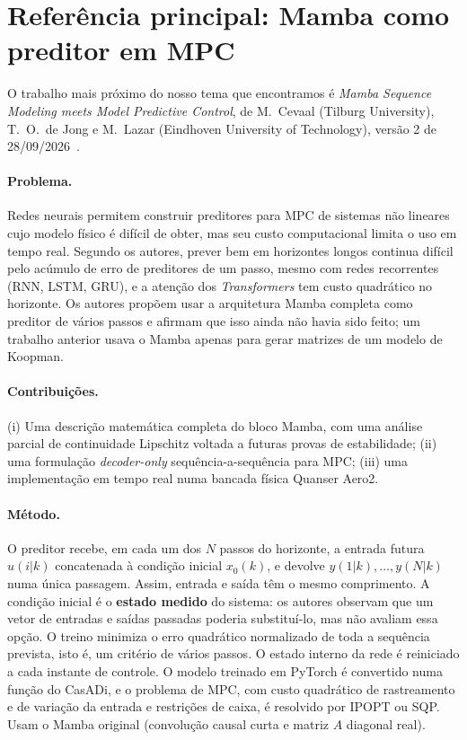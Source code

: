 \documentclass[11pt,a4paper]{article}
\begin{document}
\section{Referência principal: Mamba como preditor em MPC}\label{sec:artigo}

O trabalho mais próximo do nosso tema que encontramos é \emph{Mamba Sequence Modeling meets Model
Predictive Control}, de M.~Cevaal (Tilburg University), T.~O.~de Jong e M.~Lazar (Eindhoven
University of Technology), versão 2 de 28/09/2026~\cite{cevaal2026}.

\paragraph{Problema.} Redes neurais permitem construir preditores para MPC de sistemas não lineares
cujo modelo físico é difícil de obter, mas seu custo computacional limita o uso em tempo real.
Segundo os autores, prever bem em horizontes longos continua difícil pelo acúmulo de erro de
preditores de um passo, mesmo com redes recorrentes (RNN, LSTM, GRU), e a atenção dos
\emph{Transformers} tem custo quadrático no horizonte. Os autores propõem usar a arquitetura Mamba completa como
preditor de vários passos e afirmam que isso ainda não havia sido feito; um trabalho anterior usava
o Mamba apenas para gerar matrizes de um modelo de Koopman.

\paragraph{Contribuições.} (i) Uma descrição matemática completa do bloco Mamba, com uma análise
parcial de continuidade Lipschitz voltada a futuras provas de estabilidade; (ii) uma formulação
\emph{decoder-only} sequência-a-sequência para MPC; (iii) uma implementação em tempo real numa
bancada física Quanser Aero2.

\paragraph{Método.} O preditor recebe, em cada um dos $N$ passos do horizonte, a entrada futura
$u(i|k)$ concatenada à condição inicial $x_0(k)$, e devolve $y(1|k),\dots,y(N|k)$ numa única
passagem. Assim, entrada e saída têm o mesmo comprimento. A condição inicial é o \textbf{estado
medido} do sistema: os autores observam que um vetor de entradas e saídas passadas poderia
substituí-lo, mas não avaliam essa opção. O treino minimiza o erro quadrático normalizado de toda a
sequência prevista, isto é, um critério de vários passos. O estado interno da rede é reiniciado a
cada instante de controle. O modelo treinado em PyTorch é convertido numa função do CasADi, e o
problema de MPC, com custo quadrático de rastreamento e de variação da entrada e restrições de
caixa, é resolvido por IPOPT ou SQP. Usam o Mamba original (convolução causal curta e matriz $A$
diagonal real).
\end{document}
